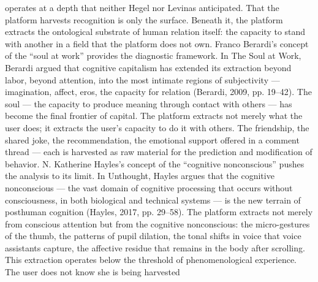 operates at a depth that neither Hegel nor Levinas anticipated. That the platform harvests recognition is only the surface. Beneath it, the platform extracts the ontological substrate of human relation itself: the capacity to stand with another in a field that the platform does not own. Franco Berardi’s concept of the “soul at work” provides the diagnostic framework. In The Soul at Work, Berardi argued that cognitive capitalism has extended its extraction beyond labor, beyond attention, into the most intimate regions of subjectivity — imagination, affect, eros, the capacity for relation (Berardi, 2009, pp. 19–42). The soul — the capacity to produce meaning through contact with others — has become the final frontier of capital. The platform extracts not merely what the user does; it extracts the user’s capacity to do it with others. The friendship, the shared joke, the recommendation, the emotional support offered in a comment thread — each is harvested as raw material for the prediction and modification of behavior. N. Katherine Hayles’s concept of the “cognitive nonconscious” pushes the analysis to its limit. In Unthought, Hayles argues that the cognitive nonconscious — the vast domain of cognitive processing that occurs without consciousness, in both biological and technical systems — is the new terrain of posthuman cognition (Hayles, 2017, pp. 29–58). The platform extracts not merely from conscious attention but from the cognitive nonconscious: the micro-gestures of the thumb, the patterns of pupil dilation, the tonal shifts in voice that voice assistants capture, the affective residue that remains in the body after scrolling. This extraction operates below the threshold of phenomenological experience. The user does not know she is being harvested

